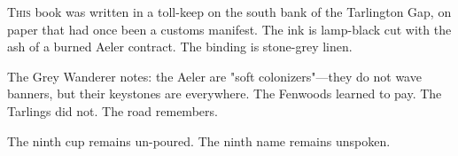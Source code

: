 \documentclass[11pt]{book}
\begin{document}
\lettrine{T}{his} book was written in a toll-keep on the south bank of the Tarlington Gap, on paper that had once been a customs manifest. The ink is lamp-black cut with the ash of a burned Aeler contract. The binding is stone-grey linen.

The Grey Wanderer notes: the Aeler are "soft colonizers"---they do not wave banners, but their keystones are everywhere. The Fenwoods learned to pay. The Tarlings did not. The road remembers.

\vspace{1em}
\noindent The ninth cup remains un-poured. The ninth name remains unspoken.
\end{document}
